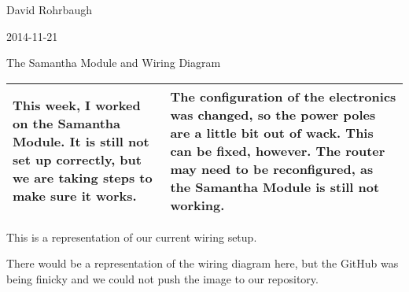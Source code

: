 David Rohrbaugh

2014-11-21

The Samantha Module and Wiring Diagram

\begin{tabular}{|p{5cm}|p{5cm}|}
 \hline
 This week, I worked on the Samantha Module. It is still not set up correctly, but we are taking steps to make sure it works.
 &
 The configuration of the electronics was changed, so the power poles are a little bit out of wack. This can be fixed, however. The router may need to be reconfigured, as the Samantha Module is still not working.
 \\
 \hline
\end{tabular}

\medskip

This is a representation of our current wiring setup.

There would be a representation of the wiring diagram here, but the GitHub was being finicky and we could not push the image to our repository.
